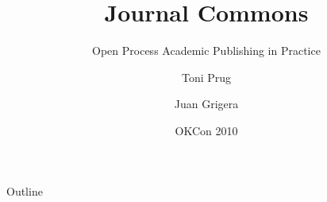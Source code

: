 \documentclass[10pt]{beamer}
\author{Toni Prug \and Juan Grigera}
\title{Journal Commons}
\subtitle{Open Process Academic Publishing in Practice}
\date{OKCon 2010}
\institute{Queen Mary and LSE}
\begin{document}
 
\begin{frame}
  \titlepage
\end{frame}

\begin{frame}{Outline}
   \tableofcontents
\end{frame}



\end{document}

